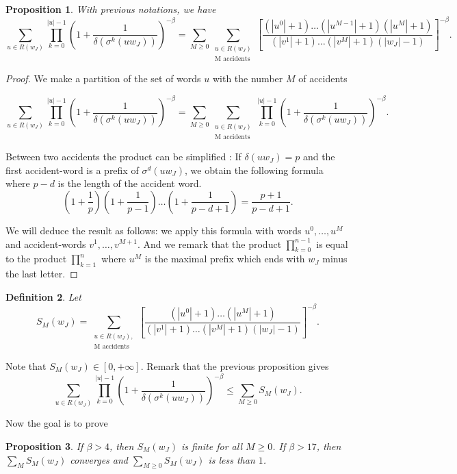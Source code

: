 \documentclass[11 pt]{article}
\newtheorem{proposition}{Proposition}
\newtheorem{definition}[proposition]{Definition}
\theoremstyle{definition}
\begin{document}
\begin{proposition}\label{prop-fract-bisp}
With previous notations, we have
$$\sum_{u\in R(w_J)}\prod_{k=0}^{|u|-1}(1+\frac{1}{\delta(\sigma^k(uw_J))})^{-\beta}=\sum_{M\geq 0}
\displaystyle\sum_{\substack{ u\in R(w_J)\\\text{M accidents}}} [\frac{(|u^0|+1)\dots (|u^{M-1}|+1)(|u^M|+1)}{(|v^1|+1)\dots (|v^M|+1)(|w_J|-1)}]^{-\beta}.$$
\end{proposition}


\begin{proof}
We make a partition of the set of words $u$ with the number $M$ of accidents

$$\sum_{u\in R(w_J)}\prod_{k=0}^{|u|-1}(1+\frac{1}{\delta(\sigma^k(uw_J))})^{-\beta}=\displaystyle\sum_{M\geq 0}\sum_{\substack{u\in R(w_J)\\ \text{M accidents}}}\prod_{k=0}^{|u|-1}(1+\frac{1}{\delta(\sigma^k(uw_J))})^{-\beta}.$$


Between two accidents the product can be simplified :
If $\delta(uw_J)=p$ and the first accident-word is a prefix of $\sigma^d(uw_J)$, we obtain the following formula where $p-d$ is the length of the accident word.
$$(1+\frac{1}{p})(1+\frac{1}{p-1}) \dots (1+\frac{1}{p-d+1})=\frac{p+1}{p-d+1}.$$

We will deduce the result as follows:
we apply this formula with words $u^0,\dots, u^M$ and accident-words $v^1, \dots, v^{M+1}$. And we remark that the product $\prod_{k=0}^{n-1}$ is equal to the product $\prod_{k=1}^n$ where $u^M$ is the maximal prefix which ends with $w_J$ minus the last letter. 

\end{proof}

\begin{definition}\label{def-SM}
Let  
$$S_M(w_J)=\displaystyle\sum_{\substack{u\in R(w_J),\\ \text{M accidents}}} [\frac{(|u^0|+1)\dots (|u^M|+1)}{(|v^1|+1)\dots (|v^M|+1)(|w_J|-1)}]^{-\beta}.$$
\end{definition}

Note that $S_M(w_J)\in[0,+\infty]$. Remark that the previous proposition gives 
\begin{equation}\label{eq-l-sum}
\sum_{u\in R(w_J)}\prod_{k=0}^{|u|-1}(1+\frac{1}{\delta(\sigma^k(uw_J))})^{-\beta}\leq \displaystyle\sum_{M\geq 0}S_M(w_J).
\end{equation}

Now the goal is to prove

\begin{proposition}\label{prop:final}
If $\beta>4$, then $S_M(w_J)$ is finite for all $M\geq 0$. 
If $\beta>17$, then $\sum_{M} S_M(w_J)$ converges and $\sum_{M\geq 0} S_M(w_J)$ is less than $1$.
\end{proposition}
\end{document}
